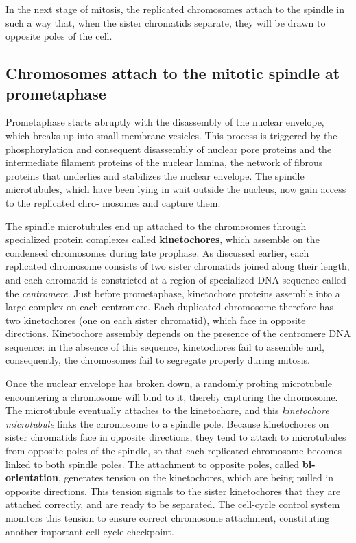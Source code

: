 In the next stage of mitosis, the replicated chromosomes attach to the
spindle in such a way that, when the sister chromatids separate, they will
be drawn to opposite poles of the cell.

\subsection{Chromosomes attach to the mitotic spindle at prometaphase}

Prometaphase starts abruptly with the disassembly of the nuclear envelope,
which breaks up into small membrane vesicles. This process is
triggered by the phosphorylation and consequent disassembly of nuclear
pore proteins and the intermediate filament proteins of the nuclear lamina,
the network of fibrous proteins that underlies and stabilizes the nuclear
envelope. The spindle microtubules, which have been
lying in wait outside the nucleus, now gain access to the replicated chro-
mosomes and capture them.

The spindle microtubules end up attached to the chromosomes through
specialized protein complexes called \textbf{kinetochores}, which assemble on
the condensed chromosomes during late prophase. As
discussed earlier, each replicated chromosome consists of two sister
chromatids joined along their length, and each chromatid is constricted
at a region of specialized DNA sequence called the \textit{centromere}.
Just before prometaphase, kinetochore proteins assemble into
a large complex on each centromere. Each duplicated chromosome
therefore has two kinetochores (one on each sister chromatid), which face
in opposite directions. Kinetochore assembly depends on the presence
of the centromere DNA sequence: in the absence of this sequence,
kinetochores fail to assemble and, consequently, the chromosomes fail
to segregate properly during mitosis.

Once the nuclear envelope has broken down, a randomly probing microtubule
encountering a chromosome will bind to it, thereby capturing the
chromosome. The microtubule eventually attaches to the kinetochore,
and this \textit{kinetochore microtubule} links the chromosome to a spindle
pole. Because kinetochores
on sister chromatids face in opposite directions, they tend to attach to
microtubules from opposite poles of the spindle, so that each replicated
chromosome becomes linked to both spindle poles. The attachment to
opposite poles, called \textbf{bi-orientation}, generates tension on the kinetochores,
which are being pulled in opposite directions. This tension signals
to the sister kinetochores that they are attached correctly, and are ready
to be separated. The cell-cycle control system monitors this tension to
ensure correct chromosome attachment, constituting another important
cell-cycle checkpoint.

